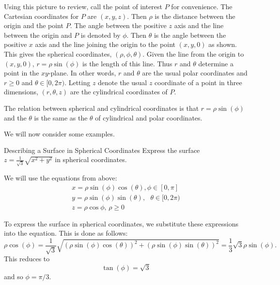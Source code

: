 Using this picture to review, call the point of interest $P$ for convenience. The Cartesian coordinates for $P$ are $(x,y,z)$. Then $\rho $ is the distance between the origin and the point $P$. The angle between
the positive $z$ axis and the line between the origin and $P$
 is denoted by $\phi $. Then $\theta $ is the angle
between the positive $x$ axis and the line joining the origin to the point 
$\left( x,y,0\right) $ as shown. This gives the spherical coordinates, $( \rho, \phi, \theta)$. Given the line from the origin to $\left( x,y,0\right) $,  $r=\rho \sin(\phi)$ is the length of this
line. Thus $r$ and $\theta $ determine a point in the $xy$-plane. In other words, $r$ and $\theta $ are the usual polar coordinates and $r\geq 0$ and $\theta \in \lbrack 0,2\pi )$. Letting $z$ denote the usual 
$z$ coordinate of a point in three dimensions, 
$\left( r,\theta ,z\right) $ are the cylindrical coordinates of $P$. 

The relation between spherical and cylindrical coordinates is that $r=\rho
\sin(\phi)$ and the $\theta$ is the same as the $\theta$ of cylindrical and polar
coordinates. 

We will now consider some examples.

\begin{example}{Describing a Surface in Spherical Coordinates}{}
Express the surface $z=\frac{1}{\sqrt{3}}\sqrt{x^{2}+y^{2}}$ in spherical
coordinates.
\end{example}

\begin{solution}
We will use the equations from above:
\[
\begin{array}{l}
x =\rho \sin \left( \phi \right) \cos \left( \theta \right), \phi \in 
\left[ 0,\pi \right]\\
 y =\rho \sin \left( \phi \right) \sin \left( \theta \right) ,\text{ }\theta
\in \lbrack 0,2\pi ) \\
 z =\rho \cos \phi \text{, }\rho \geq 0
\end{array}
\]

To express the surface in spherical coordinates, we substitute these expressions into the equation.  
This is done as follows:
\begin{equation*}
\rho \cos \left( \phi \right) =\frac{1}{\sqrt{3}}\sqrt{\left( \rho \sin
\left( \phi \right) \cos \left( \theta \right) \right) ^{2}+\left( \rho \sin
\left( \phi \right) \sin \left( \theta \right) \right) ^{2}}=\allowbreak 
\frac{1}{3}\sqrt{3}\rho \sin \left( \phi \right).
\end{equation*}
This reduces to 
\begin{equation*}
\tan \left( \phi \right)=\sqrt{3}
\end{equation*}
and so $\phi =\pi /3$.
\end{solution}

